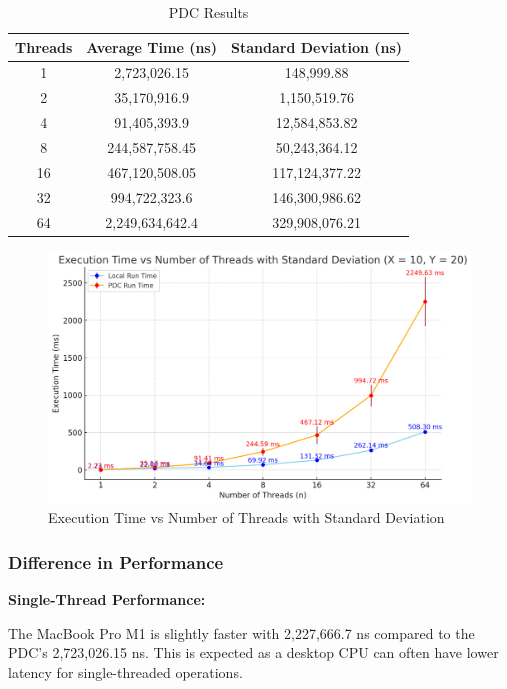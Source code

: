\documentclass{article}
\begin{document}
\begin{table}[H]
\centering
\begin{tabular}{|c|c|c|}
\hline
\textbf{Threads} & \textbf{Average Time (ns)} & \textbf{Standard Deviation (ns)} \\
\hline
1   & 2,723,026.15    & 148,999.88         \\
2   & 35,170,916.9    & 1,150,519.76       \\
4   & 91,405,393.9    & 12,584,853.82      \\
8   & 244,587,758.45  & 50,243,364.12      \\
16  & 467,120,508.05  & 117,124,377.22     \\
32  & 994,722,323.6   & 146,300,986.62     \\
64  & 2,249,634,642.4 & 329,908,076.21     \\
\hline
\end{tabular}
\caption{PDC Results}
\end{table}

\begin{figure}[H]
    \centering
    \includegraphics[width=1\linewidth]{LaTex/images/Execution Time vs Number of Threads with Standard Deviation (X = 10, Y = 20).png}
    \caption{Execution Time vs Number of Threads with Standard Deviation}
    \label{fig:1.31}
\end{figure}

\subsubsection{Difference in Performance}

\textbf{Single-Thread Performance:} 
  
  The MacBook Pro M1 is slightly faster with 2,227,666.7 ns compared to the PDC's 2,723,026.15 ns. This is expected as a desktop CPU can often have lower latency for single-threaded operations.
\end{document}
